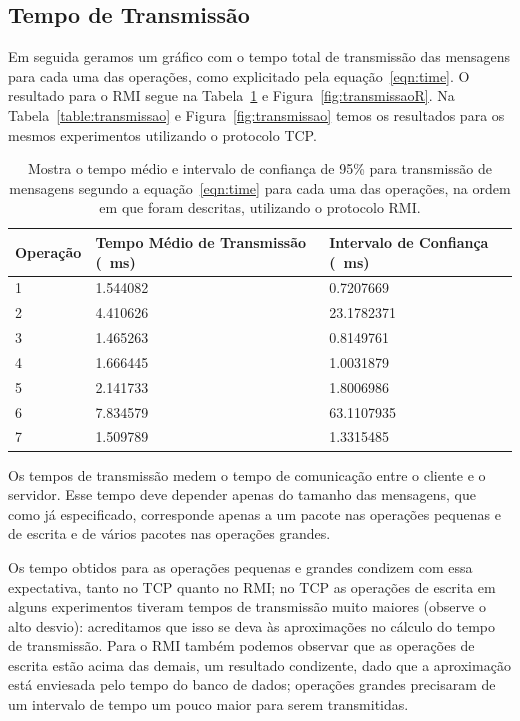 \documentclass[12pt,a4paper]{article}
\begin{document}
\subsection{Tempo de Transmissão}

Em seguida geramos um gráfico com o tempo total de transmissão das mensagens para cada uma das operações, como explicitado pela equação~\ref{eqn:time}. O resultado para o RMI segue na Tabela~\ref{table:transmissaoR} e Figura~\ref{fig:transmissaoR}. Na Tabela~\ref{table:transmissao} e Figura~\ref{fig:transmissao} temos os resultados para os mesmos experimentos utilizando o protocolo TCP.

\begin{table}[h]
\centering
\caption{Mostra o tempo médio e intervalo de confiança de 95\% para transmissão de mensagens segundo a equação~\ref{eqn:time} para cada uma das operações, na ordem em que foram descritas, utilizando o protocolo RMI.}
\label{table:transmissaoR}
\begin{tabular}{lll}
Operação & Tempo Médio de Transmissão (\SI{}{\milli\second}) & Intervalo de Confiança (\SI{}{\milli\second}) \\ \hline
1 & 1.544082 & 0.7207669  \\
2 & 4.410626 & 23.1782371 \\
3 & 1.465263 & 0.8149761  \\
4 & 1.666445 & 1.0031879  \\
5 & 2.141733 & 1.8006986  \\
6 & 7.834579 & 63.1107935 \\
7 & 1.509789 & 1.3315485 
\end{tabular}
\end{table}

Os tempos de transmissão medem o tempo de comunicação entre o cliente e o servidor. Esse tempo deve depender apenas do tamanho das mensagens, que como já especificado, corresponde apenas a um pacote nas operações pequenas e de escrita e de vários pacotes nas operações grandes. 

Os tempo obtidos para as operações pequenas e grandes condizem com essa expectativa, tanto no TCP quanto no RMI; no TCP as operações de escrita em alguns experimentos tiveram tempos de transmissão muito maiores (observe o alto desvio): acreditamos que isso se deva às aproximações no cálculo do tempo de transmissão. Para o RMI também podemos observar que as operações de escrita estão acima das demais, um resultado condizente, dado que a aproximação está enviesada pelo tempo do banco de dados; operações grandes precisaram de um intervalo de tempo um pouco maior para serem transmitidas.
\end{document}
